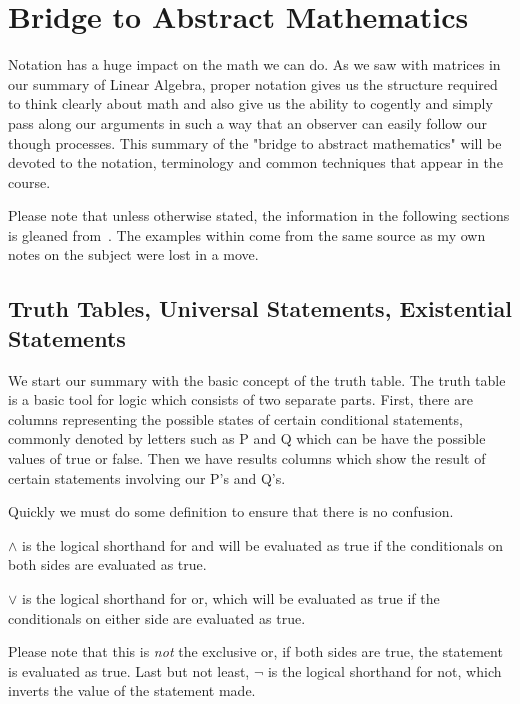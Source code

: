 
\section{Bridge to Abstract Mathematics}%
Notation has a huge impact on the math we can do. As we saw with matrices in our summary of Linear Algebra, proper notation gives us the structure required to think clearly about math and also give us the ability to cogently and simply pass along our arguments in such a way that an observer can easily follow our though processes. This summary of the "bridge to abstract mathematics" will be devoted to the notation, terminology and common techniques that appear in the course.\newline

Please note that unless otherwise stated, the information in the following sections is gleaned from~\cite{BookBridge}. The examples within come from the same source as my own notes on the subject were lost in a move.

\subsection{Truth Tables, Universal Statements, Existential Statements}
We start our summary with the basic concept of the truth table. The truth table is a basic tool for logic which consists of two separate parts. First, there are columns representing the possible states of certain conditional statements, commonly denoted by letters such as P and Q which can be have the possible values of true or false. Then we have results columns which show the result of certain statements involving our P's and Q's. \newline

Quickly we must do some definition to ensure that there is no confusion. 

\begin{definition}
$\land$ is the logical shorthand for and will be evaluated as true if the conditionals on both sides are evaluated as true.
\end{definition}

\begin{definition}
 $\lor$ is the logical shorthand for or, which will be evaluated as true if the conditionals on either side are evaluated as true.
\end{definition}
 
  Please note that this is \emph{not} the exclusive or, if both sides are true, the statement is evaluated as true. Last but not least, $\lnot$ is the logical shorthand for not, which inverts the value of the statement made.  \newline

